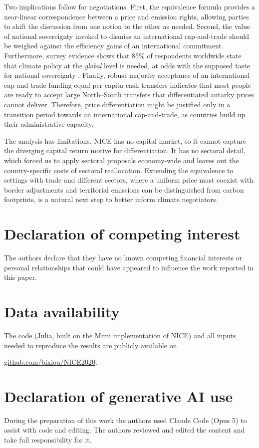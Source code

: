 \documentclass[12pt,english]{article}
\newif\ifblind
\theoremstyle{remark}
\newcommand{\competinginterests}{The authors declare that they have no known competing financial interests or personal relationships that could have appeared to influence the work reported in this paper.}
\begin{document}
Two implications follow for negotiations. First, the equivalence formula provides a near-linear correspondence between a price and emission rights, allowing parties to shift the discussion from one notion to the other as needed.
Second, the value of national sovereignty invoked to dismiss an international cap-and-trade should be weighed against the efficiency gains of an international commitment.
Furthermore, survey evidence shows
that 85\% of respondents worldwide state that climate policy at the \textit{global} level is needed, at odds with the supposed taste for national sovereignty \citep{fabre_majority_2025}. Finally, robust majority acceptance of an international cap-and-trade funding equal per capita cash transfers indicates that most people are ready to accept large North--South transfers that differentiated autarky prices cannot deliver. Therefore, price differentiation might be justified only in a transition period towards an international cap-and-trade, as countries build up their administrative capacity.

The analysis has limitations. NICE has no capital market,
so it cannot capture the diverging capital return motive
for differentiation.
It has no sectoral detail, which forced us to apply sectoral proposals economy-wide and leaves out the country-specific costs of sectoral reallocation.
Extending the equivalence to settings with trade and different sectors, where a uniform price must coexist with border adjustments and territorial emissions can be distinguished from carbon footprints, is a natural next step to better inform climate negotiators.

\section*{Declaration of competing interest}
\competinginterests

\section*{Data availability}

The code (Julia, built on the Mimi implementation of NICE) and all inputs needed to reproduce the results are publicly available on
\ifblind
[anonymised for review]
\else
\href{https://github.com/bixiou/NICE2020/tree/main/cap_and_share}{github.com/bixiou/NICE2020}.
\fi

\section*{Declaration of generative AI use}
During the preparation of this work the authors used Claude Code (Opus 5) to assist with code and editing. The authors reviewed and edited the content and take full responsibility for it.
\end{document}
